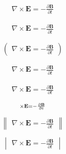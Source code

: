 \begin{multline}
\nabla \times \mathbf{E} = - \frac{\partial \mathbf{B}}{\partial t}
\end{multline}

\begin{multline*}
\nabla \times \mathbf{E} = - \frac{\partial \mathbf{B}}{\partial t}
\end{multline*}

\[
\begin{pmatrix}
\nabla \times \mathbf{E} = - \frac{\partial \mathbf{B}}{\partial t}
\end{pmatrix}
\]

\[
\begin{smallmatrix}
\nabla \times \mathbf{E} = - \frac{\partial \mathbf{B}}{\partial t}
\end{smallmatrix}
\]

\[
\begin{split}
\nabla \times \mathbf{E} = - \frac{\partial \mathbf{B}}{\partial t}
\end{split}
\]

\[
\begin{subarray}
\nabla \times \mathbf{E} = - \frac{\partial \mathbf{B}}{\partial t}
\end{subarray}
\]

\[
\begin{Vmatrix}
\nabla \times \mathbf{E} = - \frac{\partial \mathbf{B}}{\partial t}
\end{Vmatrix}
\]

\[
\begin{vmatrix}
\nabla \times \mathbf{E} = - \frac{\partial \mathbf{B}}{\partial t}
\end{vmatrix}
\]

